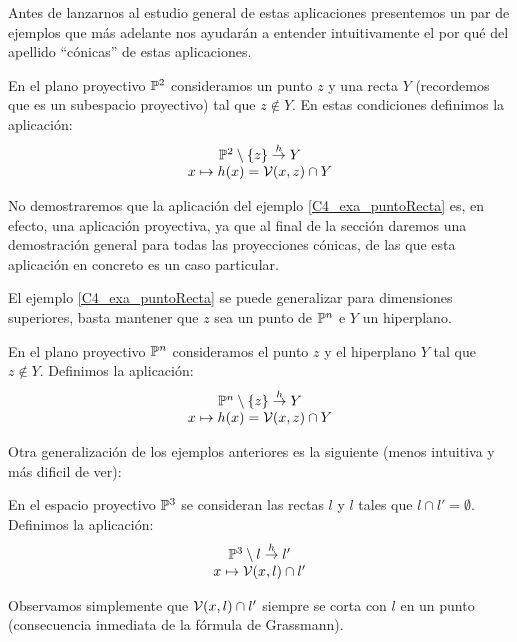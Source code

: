 Antes de lanzarnos al estudio general de estas aplicaciones presentemos un par de ejemplos que más adelante nos ayudarán a entender intuitivamente el por qué del apellido ``cónicas'' de estas aplicaciones.

\begin{exa}
	\label{C4_exa_puntoRecta}
	En el plano proyectivo $\mathbb{P}^2$ consideramos un punto $z$ y una recta $Y$ (recordemos que es un subespacio proyectivo) tal que $z\not\in Y$. En estas condiciones definimos la aplicación:
	\[\begin{array}{c}
		\mathbb{P}^2\setminus\{z\}\stackrel{h}{\to} Y\\
		x\mapsto h(x)=\mathcal{V}(x,z)\cap Y
	\end{array}\]
\end{exa}

No demostraremos que la aplicación del ejemplo \ref{C4_exa_puntoRecta} es, en efecto, una aplicación proyectiva, ya que al final de la sección daremos una demostración general para todas las proyecciones cónicas, de las que esta aplicación en concreto es un caso particular.

El ejemplo \ref{C4_exa_puntoRecta} se puede generalizar para dimensiones superiores, basta mantener que $z$ sea un punto de $\mathbb{P}^n$ e $Y$ un hiperplano.
\begin{exa}
	\label{C4_exa_puntoHiperplano}
	En el plano proyectivo $\mathbb{P}^n$ consideramos el punto $z$ y el hiperplano $Y$ tal que $z\not\in Y$. Definimos la aplicación:
	\[\begin{array}{c}
	\mathbb{P}^n\setminus\{z\}\stackrel{h}{\to} Y\\
	x\mapsto h(x)=\mathcal{V}(x,z)\cap Y
	\end{array}\]
\end{exa}
Otra generalización de los ejemplos anteriores es la siguiente (menos intuitiva y más dificil de ver):
\begin{exa}
	En el espacio proyectivo $\mathbb{P}^3$ se consideran las rectas $l$ y $l$ tales que $l\cap l'=\emptyset$. Definimos la aplicación:
	\[\begin{array}{c}
	\mathbb{P}^3\setminus l\stackrel{h}{\to}l'\\
	x\mapsto\mathcal{V}(x,l)\cap l'
	\end{array}\]
\end{exa}
Observamos simplemente que $\mathcal{V}(x,l)\cap l'$ siempre se corta con $l$ en un punto (consecuencia inmediata de la fórmula de Grassmann).

